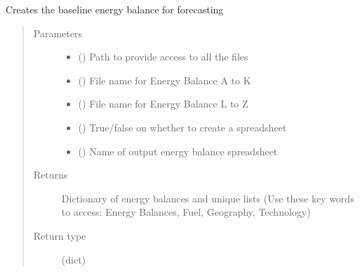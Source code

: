 \documentclass[a4paper,12pt,english]{article}
\begin{document}
\begin{fulllineitems}

\begin{fulllineitems}
\label{\detokenize{GOCPI:GOCPI.Forecasting.Forecasting.energy_balance_base}}
Creates the baseline energy balance for forecasting
\begin{quote}\begin{description}
\item[{Parameters}] \leavevmode\begin{itemize}
\item {} 
 () \textendash{} Path to provide access to all the files

\item {} 
 () \textendash{} File name for Energy Balance A to K

\item {} 
 (\sphinxstyleliteralemphasis{\sphinxupquote{{[}}}\sphinxstyleliteralemphasis{\sphinxupquote{{]}}}) \textendash{} File name for Energy Balance L to Z

\item {} 
 () \textendash{} True/false on whether to create a spreadsheet

\item {} 
 () \textendash{} Name of output energy balance spreadsheet

\end{itemize}

\item[{Returns}] \leavevmode
Dictionary of energy balances and unique lists (Use these key words to access: Energy Balances, Fuel, Geography, Technology)

\item[{Return type}] \leavevmode
(dict)

\end{description}\end{quote}

\end{fulllineitems}


\end{fulllineitems}
\end{document}
